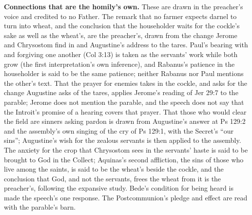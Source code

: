 {\textbf{Connections that are the homily's own.} These are drawn in the
preacher's voice and credited to no Father. The remark that no farmer expects
darnel to turn into wheat, and the conclusion that the householder waits for
the cockle's sake as well as the wheat's, are the preacher's, drawn from the
change Jerome and Chrysostom find in  and Augustine's address
to the tares. Paul's bearing with and forgiving one another (Col 3:13) is
taken as the servants' work while both grow (the first interpretation's own
inference), and Rabanus's patience in the householder is said to be the same
patience; neither Rabanus nor Paul mentions the other's text. That the prayer
for enemies takes in the cockle, and asks for the change Augustine asks of
the tares, applies Jerome's reading of Jer 29:7 to the parable; Jerome does
not mention the parable, and the speech does not say that the Introit's
promise of a hearing covers that prayer. That those who would clear the field
are sinners asking pardon is drawn from Augustine's answer at Ps 129:2 and
the assembly's own singing of the cry of Ps 129:1, with the Secret's ``our
sins''; Augustine's wish for the zealous servants is then applied to the
assembly. The anxiety for the crop that Chrysostom sees in the servants' haste
is said to be brought to God in the Collect; Aquinas's second affliction, the
sins of those who live among the saints, is said to be the wheat's beside the
cockle, and the conclusion that God, and not the servants, frees the wheat
from it is the preacher's, following the expansive study. Bede's condition
for being heard is made the speech's one response. The Postcommunion's pledge
and effect are read with the parable's barn.

}
